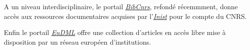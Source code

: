 A un niveau interdisciplinaire, le portail \href{https://bib.cnrs.fr/}{\emph{BibCnrs}},
refond{\'e} r{\'e}cemmment, donne acc{\`e}s aux ressources documentaires acquises par
l'\href{http://www.inist.fr/}{\emph{Inist}} pour le compte du CNRS.

Enfin le portail \href{https://eudml.org/}{\emph{EuDML}} offre une collection d'articles
en acc{\`e}s libre mise {\`a} disposition par un r{\'e}seau europ{\'e}en d'institutions.
